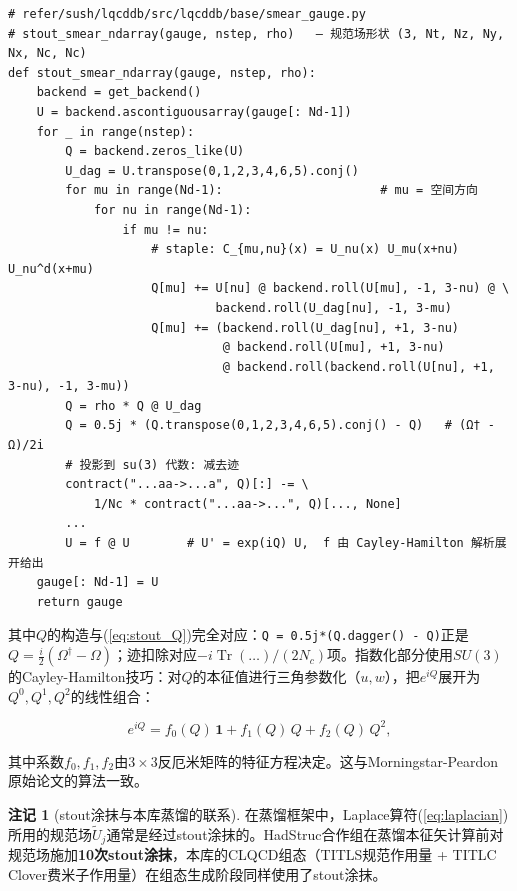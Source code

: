 \documentclass[12pt,a4paper]{ctexart}
\theoremstyle{definition}
\newtheorem{remark}{注记}[section]
\begin{document}
\begin{verbatim}
# refer/sush/lqcddb/src/lqcddb/base/smear_gauge.py
# stout_smear_ndarray(gauge, nstep, rho)   — 规范场形状 (3, Nt, Nz, Ny, Nx, Nc, Nc)
def stout_smear_ndarray(gauge, nstep, rho):
    backend = get_backend()
    U = backend.ascontiguousarray(gauge[: Nd-1])
    for _ in range(nstep):
        Q = backend.zeros_like(U)
        U_dag = U.transpose(0,1,2,3,4,6,5).conj()
        for mu in range(Nd-1):                      # mu = 空间方向
            for nu in range(Nd-1):
                if mu != nu:
                    # staple: C_{mu,nu}(x) = U_nu(x) U_mu(x+nu) U_nu^d(x+mu)
                    Q[mu] += U[nu] @ backend.roll(U[mu], -1, 3-nu) @ \
                             backend.roll(U_dag[nu], -1, 3-mu)
                    Q[mu] += (backend.roll(U_dag[nu], +1, 3-nu)
                              @ backend.roll(U[mu], +1, 3-nu)
                              @ backend.roll(backend.roll(U[nu], +1, 3-nu), -1, 3-mu))
        Q = rho * Q @ U_dag
        Q = 0.5j * (Q.transpose(0,1,2,3,4,6,5).conj() - Q)   # (Ω† - Ω)/2i
        # 投影到 su(3) 代数: 减去迹
        contract("...aa->...a", Q)[:] -= \
            1/Nc * contract("...aa->...", Q)[..., None]
        ...
        U = f @ U        # U' = exp(iQ) U,  f 由 Cayley-Hamilton 解析展开给出
    gauge[: Nd-1] = U
    return gauge
\end{verbatim}

其中$Q$的构造与(\ref{eq:stout_Q})完全对应：\texttt{Q = 0.5j*(Q.dagger() - Q)}正是$Q = \tfrac{i}{2}(\Omega^\dagger - \Omega)$；迹扣除对应$-i\operatorname{Tr}(\ldots)/(2N_c)$项。指数化部分使用$SU(3)$的Cayley-Hamilton技巧：对$Q$的本征值进行三角参数化（$u, w$），把$e^{iQ}$展开为$Q^0, Q^1, Q^2$的线性组合：

\begin{equation}
e^{iQ} = f_0(Q)\, \mathbf{1} + f_1(Q)\, Q + f_2(Q)\, Q^2,
\label{eq:cayley_hamilton}
\end{equation}

其中系数$f_0, f_1, f_2$由$3\times 3$反厄米矩阵的特征方程决定。这与Morningstar-Peardon原始论文的算法一致\cite{Morningstar2004}。

\begin{remark}[stout涂抹与本库蒸馏的联系]
\label{rem:stout_distill}
在蒸馏框架中，Laplace算符(\ref{eq:laplacian})所用的规范场$\tilde U_j$通常是经过stout涂抹的。HadStruc合作组\cite{Egerer2021a,Egerer2022}在蒸馏本征矢计算前对规范场施加\textbf{10次stout涂抹}，本库的CLQCD组态（TITLS规范作用量 + TITLC Clover费米子作用量）在组态生成阶段同样使用了stout涂抹\cite{CLQCD2024,CLQCD2025}。
\end{remark}
\end{document}

